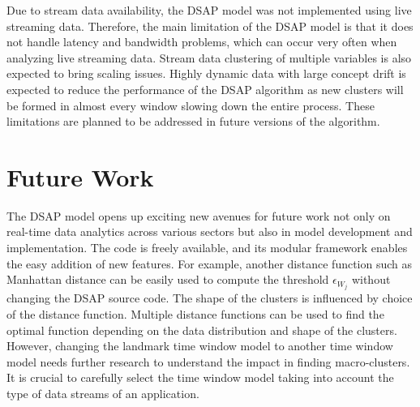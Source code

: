 Due to stream data availability, the DSAP model was not implemented using live streaming data. Therefore, the main limitation of the DSAP model is that it does not handle latency and bandwidth problems, which can occur very often when analyzing live streaming data.  Stream data clustering of multiple variables is also expected to bring scaling issues. Highly dynamic data with large concept drift is expected to reduce the performance of the DSAP algorithm as new clusters will be formed in almost every window slowing down the entire process. These limitations are planned to be addressed in future versions of the algorithm.



\section{Future Work}

The DSAP model opens up exciting new avenues for future work not only on real-time data analytics across various sectors but also in model development and implementation. The code is freely available, and its modular framework enables the easy addition of new features. For example, another distance function such as Manhattan distance can be easily used to compute the threshold $\epsilon_{W_j}$ without changing the DSAP source code. The shape of the clusters is influenced by choice of the distance function. Multiple distance functions can be used to find the optimal function depending on the data distribution and shape of the clusters. However, changing the landmark time window model to another time window model needs further research to understand the impact in finding macro-clusters. It is crucial to carefully select the time window model taking into account the type of data streams of an application.

 

